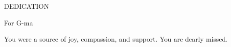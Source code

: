 \begin{center}
DEDICATION

\hspace{15cm}

For G-ma

You were a source of joy, compassion, and support. You are dearly missed.

\end{center}
